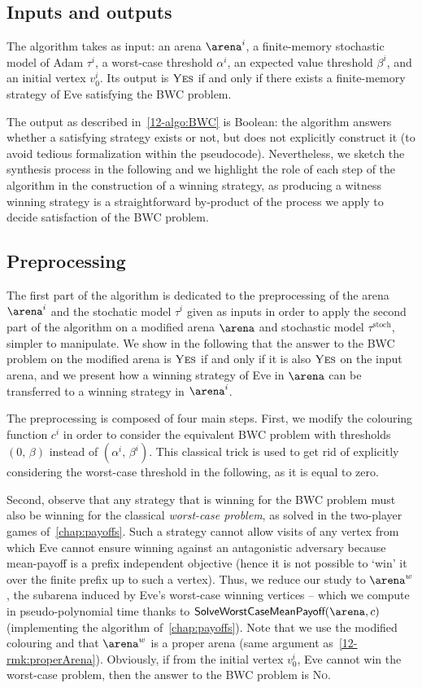 \subsection*{Inputs and outputs} The algorithm takes as input: an arena $\arena^{i}$, a finite-memory stochastic model of Adam $\tau^{i}$, a worst-case threshold $\alpha^{i}$, an expected value threshold $\beta^{i}$, and an initial vertex $v_0^{i}$. Its output is $\textsc{Yes}$ if and only if there exists a finite-memory strategy of Eve satisfying the BWC problem.

The output as described in~\cref{12-algo:BWC} is Boolean: the algorithm answers whether a satisfying strategy exists or not, but does not explicitly construct it (to avoid tedious formalization within the pseudocode). Nevertheless, we sketch the synthesis process in the following and we highlight the role of each step of the algorithm in the construction of a winning strategy, as producing a witness winning strategy is a straightforward by-product of the process we apply to decide satisfaction of the BWC problem.


\subsection*{Preprocessing} The first part of the algorithm is dedicated to the preprocessing of the arena $\arena^{i}$ and the stochatic model $\tau^{i}$ given as inputs in order to apply the second part of the algorithm on a modified arena $\arena$ and stochastic model $\tau^{\text{stoch}}$, simpler to manipulate. We show in the following that the answer to the BWC problem on the modified arena is $\textsc{Yes}$ if and only if it is also $\textsc{Yes}$ on the input arena, and we present how a winning strategy of Eve in $\arena$ can be transferred to a winning strategy in $\arena^{i}$.

The preprocessing is composed of four main steps. First, we modify the colouring function $c^i$ in order to consider the equivalent BWC problem with thresholds $(0,\, \beta)$ instead of $(\alpha^{i},\, \beta^{i})$. This classical trick is used to get rid of explicitly considering the worst-case threshold in the following, as it is equal to zero.

Second, observe that any strategy that is winning for the BWC problem must also be winning for the classical \textit{worst-case problem}, as solved in the two-player games of~\cref{chap:payoffs}. Such a strategy cannot allow visits of any vertex from which Eve cannot ensure winning against an antagonistic adversary because mean-payoff is a prefix independent objective (hence it is not possible to `win' it over the finite prefix up to such a vertex). Thus, we reduce our study to $\arena^{w}$, the subarena induced by Eve's worst-case winning vertices -- which we compute in pseudo-poly\-nomial time thanks to $\textsf{SolveWorstCaseMeanPayoff}(\arena, c)$ (implementing the algorithm of~\cref{chap:payoffs}).   Note that we use the modified colouring and that $\arena^{w}$ is a proper arena (same argument as~\cref{12-rmk:properArena}). Obviously, if from the initial vertex $v_0^{i}$, Eve cannot win the worst-case problem, then the answer to the BWC problem is \textsc{No}.

